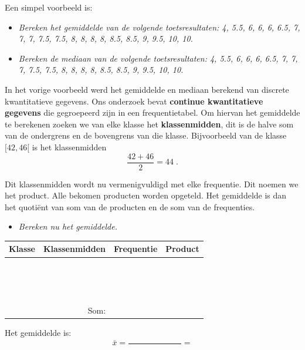 \documentclass[11pt]{article}
\newcommand{\vraag}[2]{\begin{itemize}\item {\it #1} \vspace*{#2}\end{itemize}}
\begin{document}
Een simpel voorbeeld is:

\vraag{Bereken het gemiddelde van de volgende toetsresultaten: 4, 5.5, 6, 6, 6, 6.5, 7, 7, 7, 7.5, 7.5, 8, 8, 8, 8, 8.5, 8.5, 9, 9.5, 10, 10.}{3cm}

\vraag{Bereken de mediaan van de volgende toetsresultaten: 4, 5.5, 6, 6, 6, 6.5, 7, 7, 7, 7.5, 7.5, 8, 8, 8, 8, 8.5, 8.5, 9, 9.5, 10, 10.}{3cm}

In het vorige voorbeeld werd het gemiddelde en mediaan berekend van discrete kwantitatieve gegevens. Ons
onderzoek bevat {\bf continue kwantitatieve gegevens} die gegroepeerd zijn in een frequentietabel. Om hiervan
het gemiddelde te berekenen zoeken we van elke klasse het {\bf klassenmidden}, dit is de halve som van de
ondergrens en de bovengrens van die klasse. Bijvoorbeeld van de klasse $[42, 46[$ is het klassenmidden
$$
\frac{42 + 46}{2}=44\;.
$$

Dit klassenmidden wordt nu vermenigvuldigd met elke frequentie. Dit noemen we het product. Alle bekomen producten worden opgeteld. Het gemiddelde is dan het quotiënt van som van de producten en de som van de frequenties.

\vraag{Bereken nu het gemiddelde.}{0cm}
\begin{center}
  \begin{tabular}{|p{2cm}|p{3cm}|p{2cm}|p{2cm}|}
    \hline
    Klasse & Klassenmidden & Frequentie & Product\\
    \hline&&&\\\hline&&&\\\hline&&&\\\hline&&&\\\hline&&&\\
    \hline&&&\\\hline&&&\\\hline&&&\\\hline&&&\\\hline&&&\\
    \hline&&&\\\hline&&&\\\hline&&&\\\hline&&&\\\hline&&&\\\hline
    \multicolumn{2}{r|}{Som:} & &\\\cline{3-4}
  \end{tabular}
\end{center}
Het gemiddelde is:
$$
\bar{x}=\frac{\phantom{.......................}}{\phantom{.....................}}=
$$
\vspace*{0.5cm}
\end{document}

